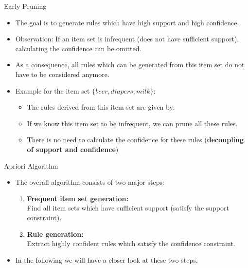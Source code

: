 \begin{dwHeaderFrame}{Early Pruning}
	\begin{itemize}
		\item The goal is to generate rules which have high support and high confidence.
		\item Observation: If an item set is infrequent (does not have sufficient support), calculating the confidence can be omitted.
		\item As a consequence, all rules which can be generated from this item set do not have to be considered anymore.
		\item Example for the item set $\{ beer, diapers, milk \}$:
		\begin{itemize}
			\item The rules derived from this item set are given by:
			\item If we know this item set to be infrequent, we can prune all these rules.
			\item There is no need to calculate the confidence for these rules (\textbf{decoupling of support and confidence})
		\end{itemize}
	\end{itemize}
\end{dwHeaderFrame}


\begin{dwHeaderFrame}{Apriori Algorithm}
	\begin{itemize}
		\item The overall algorithm consists of two major steps:
		\begin{enumerate}
			\item \textbf{Frequent item set generation:} \\
				Find all item sets which have sufficient support (satisfy the support constraint).
			\item \textbf{Rule generation:} \\
				Extract highly confident rules which satisfy the confidence constraint.
		\end{enumerate}
		\item In the following we will have a closer look at these two steps.
	\end{itemize}
\end{dwHeaderFrame}



